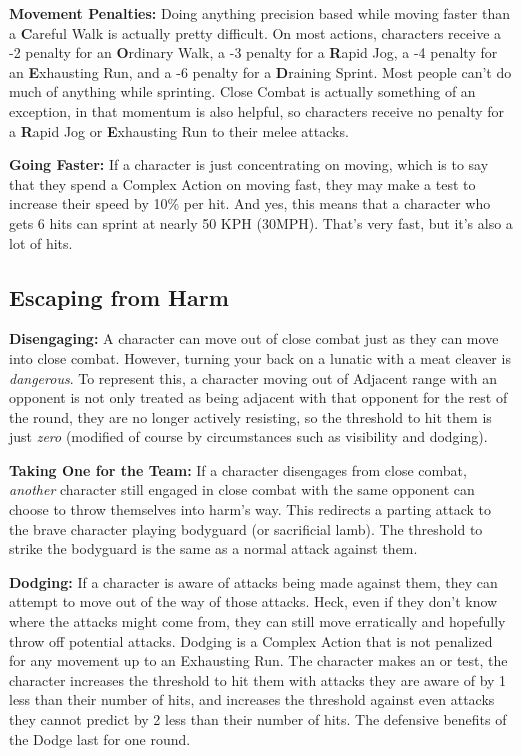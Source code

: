 \textbf{Movement Penalties:} Doing anything precision based while moving faster than a \textbf{C}areful Walk is actually pretty difficult. On most actions, characters receive a -2 penalty for an \textbf{O}rdinary Walk, a -3 penalty for a \textbf{R}apid Jog, a -4 penalty for an \textbf{E}xhausting Run, and a -6 penalty for a \textbf{D}raining Sprint. Most people can't do much of anything while sprinting. Close Combat is actually something of an exception, in that momentum is also helpful, so characters receive no penalty for a \textbf{R}apid Jog or \textbf{E}xhausting Run to their melee attacks.

\textbf{Going Faster:} If a character is just concentrating on moving, which is to say that they spend a Complex Action on moving fast, they may make a  test to increase their speed by 10\% per hit. And yes, this means that a character who gets 6 hits can sprint at nearly 50 KPH (30MPH). That's very fast, but it's also a lot of hits.

\subsection{Escaping from Harm} 

\textbf{Disengaging:} A character can move out of close combat just as they can move into close combat. However, turning your back on a lunatic with a meat cleaver is \textit{dangerous}. To represent this, a character moving out of Adjacent range with an opponent is not only treated as being adjacent with that opponent for the rest of the round, they are no longer actively resisting, so the threshold to hit them is just \textit{zero} (modified of course by circumstances such as visibility and dodging).

\textbf{Taking One for the Team:} If a character disengages from close combat, \textit{another} character still engaged in close combat with the same opponent can choose to throw themselves into harm's way. This redirects a parting attack to the brave character playing bodyguard (or sacrificial lamb). The threshold to strike the bodyguard is the same as a normal attack against them.

\textbf{Dodging:} If a character is aware of attacks being made against them, they can attempt to move out of the way of those attacks. Heck, even if they don't know where the attacks might come from, they can still move erratically and hopefully throw off potential attacks. Dodging is a Complex Action that is not penalized for any movement up to an Exhausting Run. The character makes an  or  test, the character increases the threshold to hit them with attacks they are aware of by 1 less than their number of hits, and increases the threshold against even attacks they cannot predict by 2 less than their number of hits. The defensive benefits of the Dodge last for one round.

